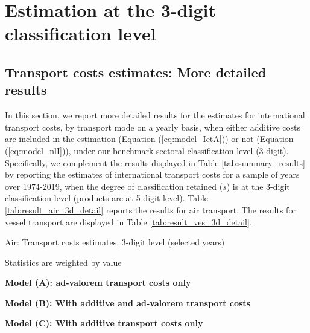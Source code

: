 \documentclass[a4paper,11pt]{article}
\begin{document}
\clearpage
\setcounter{table}{0}
\setcounter{figure}{0}
\renewcommand{\thefigure}{B.\arabic{figure}}
\renewcommand{\thetable}{B.\arabic{table}}

\section{Estimation at the 3-digit classification level \label{app:more_results}}

\subsection{Transport costs estimates: More detailed results}

In this section, we report more detailed results for the estimates for international transport costs, by transport mode on a yearly basis, when either additive costs are included in the estimation (Equation (\ref{eq:model_IetA})) or not (Equation (\ref{eq:model_nlI})), under our benchmark sectoral classification level (3 digit).
Specifically, we complement the results displayed in Table \ref{tab:summary_results} by reporting the estimates of international transport costs for a sample of years over 1974-2019, when the degree of classification retained ($s$) is at the 3-digit classification level (products are at 5-digit level).
Table \ref{tab:result_air_3d_detail} reports the results for air transport.
The results for vessel transport are displayed in Table \ref{tab:result_ves_3d_detail}.


\begin{table}[htbp]
	\centering
	\footnotesize{
	\caption{Air: Transport costs estimates, 3-digit level (selected years)}\vspace{5mm}
	\label{tab:result_air_3d_detail}%
	
   \begin{tablenotes}
	\tiny
	\item Statistics are weighted by value
	\item \textbf{Model (A): ad-valorem transport costs only}
	\item \textbf{Model (B): With additive and ad-valorem transport costs}
				\item \textbf{Model (C): With additive transport costs only}
\end{tablenotes}

}	
\end{table}%
\end{document}
